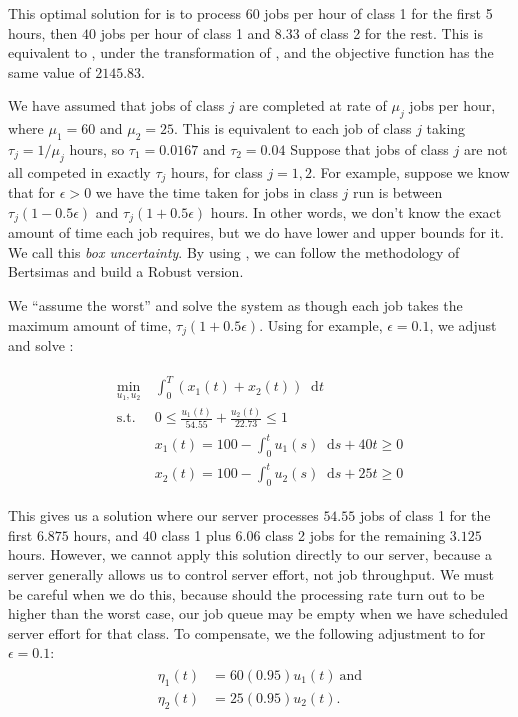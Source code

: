 \documentclass[11pt,a4paper,titlepage]{article}
\newcommand*{\dd}{\ensuremath{\mathop{}\!\mathrm{d}}}%
\theoremstyle{definition}
\theoremstyle{plain}
\begin{document}
This optimal solution for \modeltwo is to process $60$ jobs per hour of class 1
for the first 5 hours,
then $40$ jobs per hour of class 1 and $8.33$ of class 2 for the rest.
This is equivalent to \modelone,
under the transformation of ,
and the objective function has the same value of $2145.83$.

We have assumed that jobs of class $j$ are completed at rate of $\mu_j$ jobs per hour,
where $\mu_1=60$ and $\mu_2=25$.
This is equivalent to each job of class $j$ taking $\tau_j=1/\mu_j$ hours,
so $\tau_1=0.0167$ and $\tau_2 = 0.04$
Suppose that jobs of class $j$ are not all competed in exactly $\tau_j$ hours,
for class $j=1,2$.
For example,
suppose we know that for $\epsilon > 0$
we have the time taken for jobs in class $j$ run is between
$\tau_j (1 - 0.5 \epsilon)$
and
$\tau_j (1 + 0.5 \epsilon)$
hours.
In other words,
we don't know the exact amount of time each job requires,
but we do have lower and upper bounds for it.
We call this \textit{box uncertainty}.
By using \modeltwo,
we can follow the methodology of Bertsimas and build a Robust version.

We ``assume the worst'' and solve the system as though each job takes the maximum amount of time,
$\tau_j (1+ 0.5 \epsilon)$.
Using for example,
$\epsilon=0.1$,
we adjust and solve \modeltwo:

\begin{align}
    \label{eq:model-2-robust}
    \begin{split}
        \min\limits_{u_1, u_2}
        &~ \int_0^T \left( x_1(t) + x_2(t) \right) \dd t \\
        \text{s.t.}
        &~ 0 \leq \frac{u_1(t)}{54.55} + \frac{u_2(t)}{22.73} \leq 1 \\
        &~ x_1(t) = 100 - \int_0^t u_1(s) \dd s + 40t \geq 0 \\
        &~ x_2(t) = 100 - \int_0^t u_2(s) \dd s + 25t \geq 0
    \end{split}
\end{align}

This gives us a solution where our server processes $54.55$
jobs of class 1 for the first $6.875$ hours,
and $40$ class 1 plus $6.06$ class 2 jobs for the remaining $3.125$ hours.
However,
we cannot apply this solution directly to our server,
because a server generally allows us to control server effort,
not job throughput.
We must be careful when we do this,
because should the processing rate turn out to be higher than the worst case,
our job queue may be empty when we have scheduled server effort for that class.
To compensate,
we the following adjustment to  for $\epsilon=0.1$:
\begin{align}
    \label{eq:model-2-translation-robust}
    \begin{split}
        \eta_1(t) & = 60(0.95) u_1(t) ~ \text{and} \\
        \eta_2(t) & = 25(0.95) u_2(t).
    \end{split}
\end{align}
\end{document}
